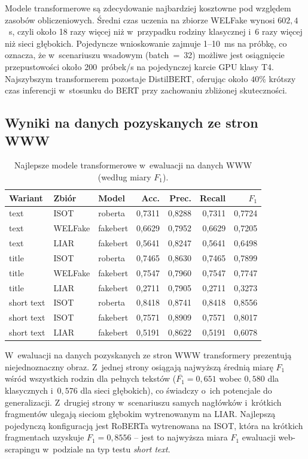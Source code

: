 Modele transformerowe są zdecydowanie najbardziej kosztowne pod
względem zasobów obliczeniowych. Średni czas uczenia na zbiorze
WELFake wynosi \(602{,}4\)~s, czyli około 18 razy więcej niż
w~przypadku rodziny klasycznej i~6 razy więcej niż sieci głębokich.
Pojedyncze wnioskowanie zajmuje 1--10~ms na próbkę, co oznacza,
że w~scenariuszu wsadowym (batch~=~32) możliwe jest osiągnięcie
przepustowości około 200~próbek/s na pojedynczej karcie GPU klasy
T4. Najszybszym transformerem pozostaje DistilBERT, oferując około
\(40\%\) krótszy czas inferencji w~stosunku do BERT przy zachowaniu
zbliżonej skuteczności.

\subsection{Wyniki na danych pozyskanych ze stron WWW}
\label{sec:wyniki_bert_web}

\begin{table}[ht]
\centering
\caption{Najlepsze modele transformerowe w~ewaluacji na danych WWW
(według miary $F_1$).}
\label{tab:bert_web}
\begin{tabular}{lllrrrr}
\toprule
Wariant & Zbiór & Model & Acc. & Prec. & Recall & $F_1$ \\
\midrule
text       & ISOT    & roberta    & 0,7311 & 0,8288 & 0,7311 & 0,7724 \\
text       & WELFake & fakebert   & 0,6629 & 0,7952 & 0,6629 & 0,7205 \\
text       & LIAR    & fakebert   & 0,5641 & 0,8247 & 0,5641 & 0,6498 \\
title      & ISOT    & roberta    & 0,7465 & 0,8630 & 0,7465 & 0,7899 \\
title      & WELFake & fakebert   & 0,7547 & 0,7960 & 0,7547 & 0,7747 \\
title      & LIAR    & fakebert   & 0,2711 & 0,7905 & 0,2711 & 0,3273 \\
short text & ISOT    & roberta    & 0,8418 & 0,8741 & 0,8418 & 0,8556 \\
short text & ISOT    & fakebert   & 0,7571 & 0,8909 & 0,7571 & 0,8017 \\
short text & LIAR    & fakebert   & 0,5191 & 0,8622 & 0,5191 & 0,6078 \\
\bottomrule
\end{tabular}
\end{table}

W~ewaluacji na danych pozyskanych ze stron WWW transformery
prezentują niejednoznaczny obraz. Z~jednej strony osiągają najwyższą
średnią miarę $F_1$ wśród wszystkich rodzin dla pełnych tekstów
(\(\overline{F_1} = 0{,}651\) wobec \(0{,}580\) dla klasycznych
i~\(0{,}576\) dla sieci głębokich), co świadczy o~ich potencjale do
generalizacji. Z~drugiej strony w~scenariuszu samych nagłówków
i~krótkich fragmentów ulegają sieciom głębokim wytrenowanym na LIAR.
Najlepszą pojedynczą konfiguracją jest RoBERTa wytrenowana na ISOT,
która na krótkich fragmentach uzyskuje \(F_1 = 0{,}8556\) -- jest to
najwyższa miara $F_1$ ewaluacji web-scrapingu w~podziale na typ
testu \textit{short text}.

